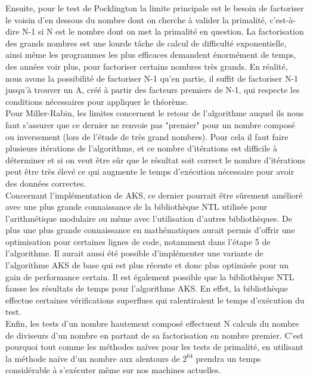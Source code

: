 		Ensuite, pour le test de Pocklington la limite principale est le besoin de factoriser le voisin d’en dessous du nombre dont on cherche à valider la primalité, c’est-à-dire N-1 si N est le nombre dont on met la primalité en question. La factorisation des grands nombres est une lourde tâche de calcul de difficulté exponentielle, ainsi même les programmes les plus efficaces demandent énormément de temps, des années voir plus, pour factoriser certains nombres très grands.
En réalité, nous avons la possibilité de factoriser N-1 qu’en partie, il suffit de factoriser N-1 jusqu’à trouver un A, créé à partir des facteurs premiers de N-1, qui respecte les conditions nécessaires pour appliquer le théorème.\\

		Pour Miller-Rabin, les limites concernent le retour de l'algorithme auquel ils nous faut s'assurer que ce dernier ne renvoie pas "premier" pour un nombre composé ou inversement (lors de l'étude de très grand nombres). Pour cela il faut faire plusieurs itérations de l'algorithme, et ce nombre d'itérations est difficile à déterminer et si on veut être sûr que le résultat soit correct le nombre d'itérations peut être très élevé ce qui augmente le temps d'exécution nécessaire pour avoir des données correctes.\\	
		
		Concernant l'implémentation de AKS, ce dernier pourrait être sûrement amélioré avec une plus grande connaissance de la bibliothèque NTL utilisée pour l'arithmétique modulaire ou même avec l'utilisation d'autres bibliothèques. De plus une plus grande connaissance en mathématiques aurait permis d'offrir une optimisation pour certaines lignes de code, notamment dans l'étape 5 de l’algorithme. Il aurait aussi été possible d'implémenter une variante de l’algorithme AKS de base qui est plus récente et donc plus optimisée pour un gain de performance certain.
Il est également possible que la bibliothèque NTL fausse les résultats de temps pour l'algorithme AKS. En effet, la bibliothèque effectue certaines vérifications superflues qui ralentiraient le temps d’exécution du test.\\
		
		Enfin, les tests d'un nombre hautement composé effectuent N calculs du nombre de diviseurs d'un nombre en partant de sa factorisation en nombre premier. C'est pourquoi tout comme les méthodes naïves pour les tests de primalité, en utilisant la méthode naïve d'un nombre aux alentours de $2^{64}$ prendra un temps considérable à s’exécuter même sur nos machines actuelles.
					
